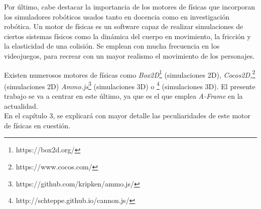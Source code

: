 Por último, cabe destacar la importancia de los motores de físicas que incorporan los simuladores robóticos usados tanto en docencia como en investigación robótica. Un motor de físicas es un software capaz de realizar simulaciones de ciertos sistemas físicos como la dinámica del cuerpo en movimiento, la fricción y la elasticidad de una colisión. Se emplean con mucha frecuencia en los videojuegos, para recrear con un mayor realismo el movimiento de los personajes. \newline

Existen numerosos motores de físicas como \textit{Box2D}\footnote{https://box2d.org/} (simulaciones 2D), \textit{Cocos2D,}\footnote{https://www.cocos.com/} (simulaciones 2D) \textit{Ammo.js}\footnote{https://github.com/kripken/ammo.js/} (simulaciones 3D) o \footnote{http://schteppe.github.io/cannon.js/} (simulaciones 3D). El presente trabajo se va a centrar en este último, ya que es el que emplea \textit{A-Frame} en la actualidad. \\ En el capítulo 3, se explicará con mayor detalle las peculiaridades de este motor de físicas en cuestión. 

